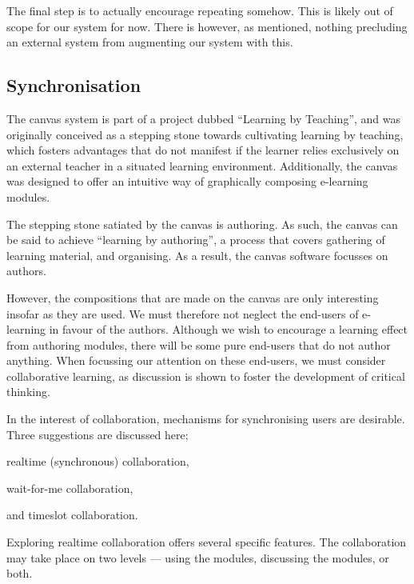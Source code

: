 \documentclass{article}
\begin{document}
\begin{multicols}{2}
The final step is to actually encourage repeating somehow. This is likely out 
of scope for our system for now. There is however, as mentioned, nothing 
precluding an external system from augmenting our system with this.
 \subsection{Synchronisation}
\label{synchronisation}
The canvas system is part of a project dubbed ``Learning by Teaching'', and 
was originally conceived as a stepping stone towards cultivating learning by 
teaching, which fosters advantages that do not manifest if the learner relies 
exclusively on an external teacher in a situated learning 
environment\cite{cortese2005learning}. Additionally, the canvas was designed 
to offer an intuitive way of graphically composing e-learning 
modules\cite{berntsen2015enabling}.

The stepping stone satiated by the canvas is authoring. As such, the canvas 
can be said to achieve ``learning by authoring'', a process that covers 
gathering of learning material, and organising. As a result, the canvas 
software focusses on authors.

However, the compositions that are made on the canvas are only interesting 
insofar as they are used. We must therefore not neglect the end-users of 
e-learning in favour of the authors. Although we wish to encourage a learning 
effect from authoring modules, there will be some pure end-users that do not 
author anything. When focussing our attention on these end-users, we must 
consider collaborative learning, as discussion is shown to foster the 
development of critical thinking\cite{gokhale1995collaborative}.

In the interest of collaboration, mechanisms for synchronising users are 
desirable. Three suggestions are discussed here;
\begin{itemize*}
  \item realtime (synchronous) collaboration,
  \item wait-for-me collaboration,
  \item and timeslot collaboration.
\end{itemize*}

Exploring realtime collaboration offers several specific features. The 
collaboration may take place on two levels --- using the modules, discussing 
the modules, or both.


\end{multicols}
\end{document}
